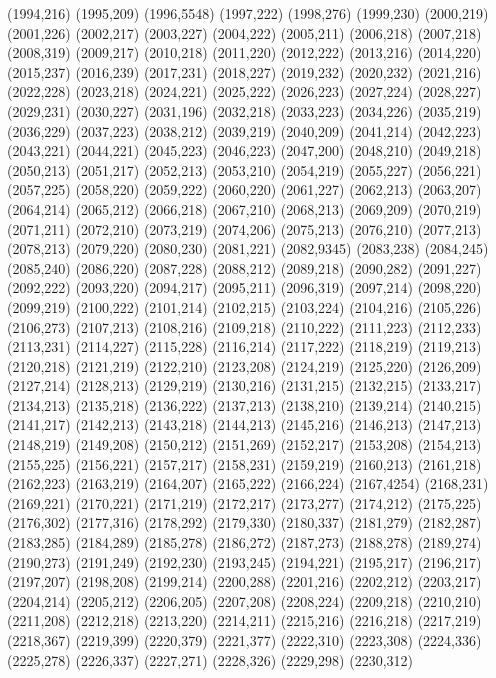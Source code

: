 (1994,216)
(1995,209)
(1996,5548)
(1997,222)
(1998,276)
(1999,230)
(2000,219)
(2001,226)
(2002,217)
(2003,227)
(2004,222)
(2005,211)
(2006,218)
(2007,218)
(2008,319)
(2009,217)
(2010,218)
(2011,220)
(2012,222)
(2013,216)
(2014,220)
(2015,237)
(2016,239)
(2017,231)
(2018,227)
(2019,232)
(2020,232)
(2021,216)
(2022,228)
(2023,218)
(2024,221)
(2025,222)
(2026,223)
(2027,224)
(2028,227)
(2029,231)
(2030,227)
(2031,196)
(2032,218)
(2033,223)
(2034,226)
(2035,219)
(2036,229)
(2037,223)
(2038,212)
(2039,219)
(2040,209)
(2041,214)
(2042,223)
(2043,221)
(2044,221)
(2045,223)
(2046,223)
(2047,200)
(2048,210)
(2049,218)
(2050,213)
(2051,217)
(2052,213)
(2053,210)
(2054,219)
(2055,227)
(2056,221)
(2057,225)
(2058,220)
(2059,222)
(2060,220)
(2061,227)
(2062,213)
(2063,207)
(2064,214)
(2065,212)
(2066,218)
(2067,210)
(2068,213)
(2069,209)
(2070,219)
(2071,211)
(2072,210)
(2073,219)
(2074,206)
(2075,213)
(2076,210)
(2077,213)
(2078,213)
(2079,220)
(2080,230)
(2081,221)
(2082,9345)
(2083,238)
(2084,245)
(2085,240)
(2086,220)
(2087,228)
(2088,212)
(2089,218)
(2090,282)
(2091,227)
(2092,222)
(2093,220)
(2094,217)
(2095,211)
(2096,319)
(2097,214)
(2098,220)
(2099,219)
(2100,222)
(2101,214)
(2102,215)
(2103,224)
(2104,216)
(2105,226)
(2106,273)
(2107,213)
(2108,216)
(2109,218)
(2110,222)
(2111,223)
(2112,233)
(2113,231)
(2114,227)
(2115,228)
(2116,214)
(2117,222)
(2118,219)
(2119,213)
(2120,218)
(2121,219)
(2122,210)
(2123,208)
(2124,219)
(2125,220)
(2126,209)
(2127,214)
(2128,213)
(2129,219)
(2130,216)
(2131,215)
(2132,215)
(2133,217)
(2134,213)
(2135,218)
(2136,222)
(2137,213)
(2138,210)
(2139,214)
(2140,215)
(2141,217)
(2142,213)
(2143,218)
(2144,213)
(2145,216)
(2146,213)
(2147,213)
(2148,219)
(2149,208)
(2150,212)
(2151,269)
(2152,217)
(2153,208)
(2154,213)
(2155,225)
(2156,221)
(2157,217)
(2158,231)
(2159,219)
(2160,213)
(2161,218)
(2162,223)
(2163,219)
(2164,207)
(2165,222)
(2166,224)
(2167,4254)
(2168,231)
(2169,221)
(2170,221)
(2171,219)
(2172,217)
(2173,277)
(2174,212)
(2175,225)
(2176,302)
(2177,316)
(2178,292)
(2179,330)
(2180,337)
(2181,279)
(2182,287)
(2183,285)
(2184,289)
(2185,278)
(2186,272)
(2187,273)
(2188,278)
(2189,274)
(2190,273)
(2191,249)
(2192,230)
(2193,245)
(2194,221)
(2195,217)
(2196,217)
(2197,207)
(2198,208)
(2199,214)
(2200,288)
(2201,216)
(2202,212)
(2203,217)
(2204,214)
(2205,212)
(2206,205)
(2207,208)
(2208,224)
(2209,218)
(2210,210)
(2211,208)
(2212,218)
(2213,220)
(2214,211)
(2215,216)
(2216,218)
(2217,219)
(2218,367)
(2219,399)
(2220,379)
(2221,377)
(2222,310)
(2223,308)
(2224,336)
(2225,278)
(2226,337)
(2227,271)
(2228,326)
(2229,298)
(2230,312)
